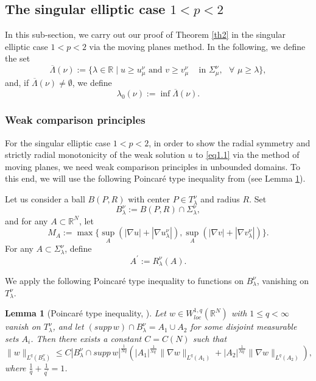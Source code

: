 \documentclass[12pt]{amsart}
\newtheorem{lem}[thm]{Lemma}
\theoremstyle{definition}
\theoremstyle{remark}
\theoremstyle{conclusion}
\theoremstyle{conjecture}
\numberwithin{equation}{section}
\newcommand{\R}{\mathbb{R}}
\begin{document}
\subsection{The singular elliptic case $1<p<2$}\label{sc4.2}

In this sub-section, we carry out our proof of Theorem \ref{th2} in the singular elliptic case $1<p<2$ via the moving planes method. In the following, we define the set
$$\overline{\Lambda}(\nu):=\{ \lambda\in\R \mid u\geq u_\mu^\nu\,\, \mbox{and} \,\, v\geq v_\mu^\nu\,\quad \mbox{in}\,\,\Sigma_\mu^\nu,\,\,\,\,\forall \,\, \mu\geq\lambda \},$$
and, if $\overline{\Lambda}(\nu)\neq\emptyset$, we define
$$ \lambda_0(\nu):=\inf \overline{\Lambda}(\nu).$$


\subsubsection{Weak comparison principles}
For the singular elliptic case $1<p<2$, in order to show the radial symmetry and strictly radial monotonicity of the weak solution $u$ to \eqref{eq1.1} via the method of moving planes, we need weak comparison principles in unbounded domains. To this end, we will use the following Poincar\'{e} type inequality from \cite{LDMR} (see Lemma \ref{PTI}).

Let us consider a ball $B(P,R)$ with center $P\in T_\lambda^\nu$ and radius $R$. Set
$$B_\lambda^\nu:=B(P,R)\cap\Sigma_\lambda^\nu,$$
and for any $A\subset\R^N$, let
$$ M_A:=\max\{\sup_A (|\nabla u|+|\nabla u^{\nu}_{\lambda}|), \sup_A (|\nabla v|+|\nabla v^{\nu}_{\lambda}|)\}.$$
For any $A\subset \Sigma_\lambda^\nu$, define
$$A^\prime:=R_\lambda^\nu(A).$$

We apply the following Poincar\'{e} type inequality to functions on $B_\lambda^\nu$, vanishing on $T^\nu_\lambda$.
\begin{lem}[Poincar\'{e} type inequality, \cite{LDMR}]\label{PTI}
Let $w\in W^{1,q}_{loc} (\R^N)$ with $1\leq q< \infty$ vanish on $T^\nu_\lambda$, and let $(supp\,w)\cap B_\lambda^\nu =A_1\cup A_2$ for some disjoint measurable sets $A_i$. Then there exists a constant $C=C(N)$ such that
$$ \| w \|_{L^q(B_\lambda^\nu)} \leq C |B_\lambda^\nu\cap supp \, w|^\frac{1}{Nq} \left( |A_1|^\frac{1}{Nq^\prime} \| \nabla w \|_{L^q(A_1)} + |A_2|^\frac{1}{Nq^\prime} \| \nabla w \|_{L^q(A_2)}  \right),$$
where $ \frac{1}{q}+ \frac{1}{q^\prime} =1 $.
\end{lem}
\end{document}

